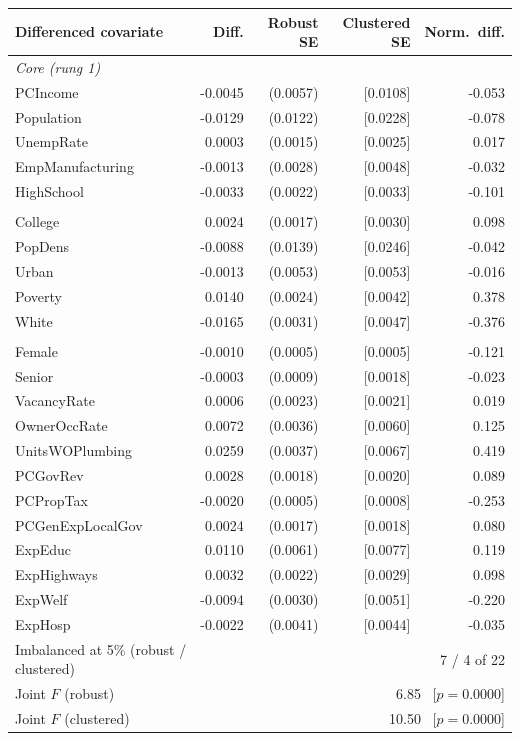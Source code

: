 \begin{tabular}{lrrrr}
\toprule
Differenced covariate & Diff. & Robust SE & Clustered SE & Norm.\ diff. \\
\midrule
\multicolumn{5}{l}{\textit{Core (rung 1)}} \\
\quad PCIncome & -0.0045 & (0.0057) & [0.0108] & -0.053 \\
\quad Population & -0.0129 & (0.0122) & [0.0228] & -0.078 \\
\quad UnempRate & 0.0003 & (0.0015) & [0.0025] & 0.017 \\
\quad EmpManufacturing & -0.0013 & (0.0028) & [0.0048] & -0.032 \\
\quad HighSchool & -0.0033 & (0.0022) & [0.0033] & -0.101 \\
\addlinespace
\multicolumn{5}{l}{\textit{Demographic (rung 2)}} \\
\quad College & 0.0024 & (0.0017) & [0.0030] & 0.098 \\
\quad PopDens & -0.0088 & (0.0139) & [0.0246] & -0.042 \\
\quad Urban & -0.0013 & (0.0053) & [0.0053] & -0.016 \\
\quad Poverty & 0.0140 & (0.0024) & [0.0042] & 0.378 \\
\quad White & -0.0165 & (0.0031) & [0.0047] & -0.376 \\
\addlinespace
\multicolumn{5}{l}{\textit{Housing and fiscal (rung 3)}} \\
\quad Female & -0.0010 & (0.0005) & [0.0005] & -0.121 \\
\quad Senior & -0.0003 & (0.0009) & [0.0018] & -0.023 \\
\quad VacancyRate & 0.0006 & (0.0023) & [0.0021] & 0.019 \\
\quad OwnerOccRate & 0.0072 & (0.0036) & [0.0060] & 0.125 \\
\quad UnitsWOPlumbing & 0.0259 & (0.0037) & [0.0067] & 0.419 \\
\quad PCGovRev & 0.0028 & (0.0018) & [0.0020] & 0.089 \\
\quad PCPropTax & -0.0020 & (0.0005) & [0.0008] & -0.253 \\
\quad PCGenExpLocalGov & 0.0024 & (0.0017) & [0.0018] & 0.080 \\
\quad ExpEduc & 0.0110 & (0.0061) & [0.0077] & 0.119 \\
\quad ExpHighways & 0.0032 & (0.0022) & [0.0029] & 0.098 \\
\quad ExpWelf & -0.0094 & (0.0030) & [0.0051] & -0.220 \\
\quad ExpHosp & -0.0022 & (0.0041) & [0.0044] & -0.035 \\
\midrule
Imbalanced at 5\% (robust / clustered) & \multicolumn{4}{r}{7 / 4 of 22} \\
Joint $F$ (robust) & \multicolumn{4}{r}{6.85 \ [$p = 0.0000$]} \\
Joint $F$ (clustered) & \multicolumn{4}{r}{10.50 \ [$p = 0.0000$]} \\
\bottomrule
\end{tabular}
